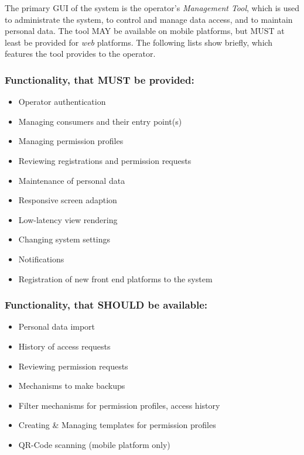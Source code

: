 \documentclass[12pt,english,a4paper,titlepage,cleardoublepage=empty,dottedtoc]{report}
\providecommand{\tightlist}{%
  \setlength{\itemsep}{0pt}\setlength{\parskip}{0pt}}
\begin{document}
The primary GUI of the system is the operator's \emph{Management Tool},
which is used to administrate the system, to control and manage data
access, and to maintain personal data. The tool MAY be available on
mobile platforms, but MUST at least be provided for \emph{web}
platforms. The following lists show briefly, which features the tool
provides to the operator.

\subsubsection{Functionality, that MUST be
provided:}\label{functionality-that-must-be-provided}

\begin{itemize}
\tightlist
\item
  Operator authentication
\item
  Managing consumers and their entry point(s)
\item
  Managing permission profiles
\item
  Reviewing registrations and permission requests
\item
  Maintenance of personal data
\item
  Responsive screen adaption
\item
  Low-latency view rendering
\item
  Changing system settings
\item
  Notifications
\item
  Registration of new front end platforms to the system
\end{itemize}

\subsubsection{Functionality, that SHOULD be
available:}\label{functionality-that-should-be-available}

\begin{itemize}
\tightlist
\item
  Personal data import
\item
  History of access requests
\item
  Reviewing permission requests
\item
  Mechanisms to make backups
\item
  Filter mechanisms for permission profiles, access history
\item
  Creating \& Managing templates for permission profiles
\item
  QR-Code scanning (mobile platform only)
\end{itemize}
\end{document}
